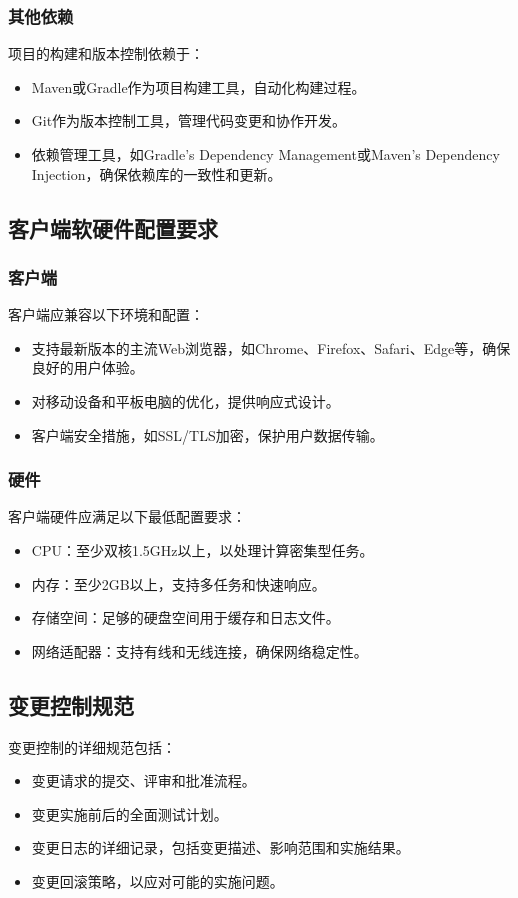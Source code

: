 \subsubsection{其他依赖}
项目的构建和版本控制依赖于：
\begin{itemize}
	\item Maven或Gradle作为项目构建工具，自动化构建过程。
	\item Git作为版本控制工具，管理代码变更和协作开发。
	\item 依赖管理工具，如Gradle's Dependency Management或Maven's Dependency Injection，确保依赖库的一致性和更新。
\end{itemize}

\subsection{客户端软硬件配置要求}
\subsubsection{客户端}
客户端应兼容以下环境和配置：
\begin{itemize}
	\item 支持最新版本的主流Web浏览器，如Chrome、Firefox、Safari、Edge等，确保良好的用户体验。
	\item 对移动设备和平板电脑的优化，提供响应式设计。
	\item 客户端安全措施，如SSL/TLS加密，保护用户数据传输。
\end{itemize}

\subsubsection{硬件}
客户端硬件应满足以下最低配置要求：
\begin{itemize}
	\item CPU：至少双核1.5GHz以上，以处理计算密集型任务。
	\item 内存：至少2GB以上，支持多任务和快速响应。
	\item 存储空间：足够的硬盘空间用于缓存和日志文件。
	\item 网络适配器：支持有线和无线连接，确保网络稳定性。
\end{itemize}

\subsection{变更控制规范}
变更控制的详细规范包括：
\begin{itemize}
	\item 变更请求的提交、评审和批准流程。
	\item 变更实施前后的全面测试计划。
	\item 变更日志的详细记录，包括变更描述、影响范围和实施结果。
	\item 变更回滚策略，以应对可能的实施问题。
\end{itemize}

